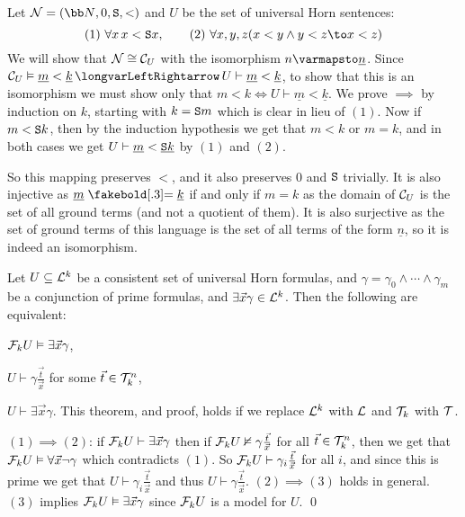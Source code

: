 \bexam

    Let ${\cal N}=({\bb N},0,{\tt S},<)$ and $U$ be the set of universal Horn sentences:
    $$ (1)\ \forall x\,x<{\tt S}x,\qquad (2)\ \forall x,y,z(x<y\land y<z\to x<z) $$
    We will show that ${\cal N}\cong{\cal C}_U$ with the isomorphism $n\varmapsto\underline n$.
    Since ${\cal C}_U\vDash\underline m<\underline k\iff U\vdash\underline m<\underline k$, to show that this is an isomorphism we must show only that $m<k\iff U\vdash\underline m<\underline k$.
    We prove $\implies$ by induction on $k$, starting with $k={\tt S}m$ which is clear in lieu of $(1)$.
    Now if $m<{\tt S}k$, then by the induction hypothesis we get that $m<k$ or $m=k$, and in both cases we get $U\vdash\underline m<\underline{{\tt S}k}$ by $(1)$ and $(2)$.

    So this mapping preserves $<$, and it also preserves $0$ and ${\tt S}$ trivially.
    It is also injective as $\underline m\eq\underline k$ if and only if $m=k$ as the domain of ${\cal C}_U$ is the set of all ground terms (and not a quotient of them).
    It is also surjective as the set of ground terms of this language is the set of all terms of the form $\underline n$, so it is indeed an isomorphism.

\eexam

\bthrm

    Let $U\subseteq{\cal L}^k$ be a consistent set of universal Horn formulas, and $\gamma=\gamma_0\land\cdots\land\gamma_m$ be a conjunction of prime formulas, and $\exists\vec x\gamma\in{\cal L}^k$.
    Then the following are equivalent:
    \benum
        \item ${\cal F}_kU\vDash\exists\vec x\gamma$,
        \item $U\vdash\gamma\frac{\vec t}{\vec x}$ for some $\vec t\in{\cal T}^n_k$,
        \item $U\vdash\exists\vec x\gamma$.
    \eenum
    This theorem, and proof, holds if we replace ${\cal L}^k$ with ${\cal L}$ and ${\cal T}_k$ with ${\cal T}$.

\ethrm

$(1)\implies(2)$: if ${\cal F}_kU\vdash\exists\vec x\gamma$ then if ${\cal F}_kU\nvDash\gamma\frac{\vec t}{\vec x}$ for all $\vec t\in{\cal T}^n_k$, then we get that
${\cal F}_kU\vDash\forall\vec x\neg\gamma$ which contradicts $(1)$.
So ${\cal F}_kU\vdash\gamma_i\frac{\vec t}{\vec x}$ for all $i$, and since this is prime we get that $U\vdash\gamma_i\frac{\vec t}{\vec x}$ and thus $U\vdash\gamma\frac{\vec t}{\vec x}$.
$(2)\implies(3)$ holds in general.
$(3)$ implies ${\cal F}_kU\vDash\exists\vec x\gamma$ since ${\cal F}_kU$ is a model for $U$.
\qed

